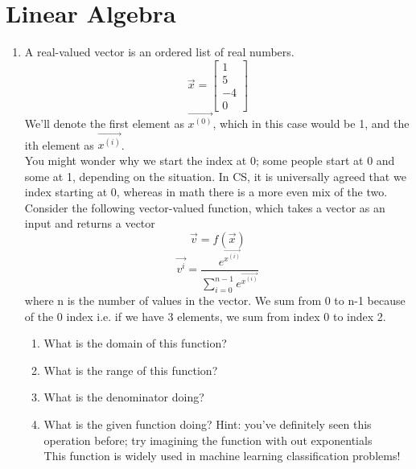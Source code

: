 \documentclass{article}
\begin{document}
\section{Linear Algebra}
\begin{enumerate}
    \item A real-valued vector is an ordered list of real numbers.
    \[ \vec{x} = \begin{bmatrix}1 \\ 5 \\ -4 \\ 0\end{bmatrix}\]
    We'll denote the first element as $\vec{x^{(0)}}$, which in this case would be 1, and the ith element as $\vec{x^{(i)}}$.\\
    You might wonder why we start the index at 0; some people start at 0 and some at 1, depending on the situation. In CS, it is universally agreed that we index starting at 0, whereas in math there is a more even mix of the two.\\
    Consider the following vector-valued function, which takes a vector as an input and returns a vector
    \[ \vec{v} = f(\vec{x})\]
    \[ \vec{v^{i}} = \frac{e^{\vec{x^{(i)}}}}{\sum\limits_{i=0}^{n-1} e^{\vec{x^{(i)}}}} \]
    where n is the number of values in the vector. We sum from 0 to n-1 because of the 0 index i.e. if we have 3 elements, we sum from index 0 to index 2. \\
    \begin{enumerate}
        \item What is the domain of this function?
        \item What is the range of this function?
        \item What is the denominator doing?
        \item What is the given function doing? Hint: you've definitely seen this operation before; try imagining the function with out exponentials\\
        \newline
        This function is widely used in machine learning classification problems!
    \end{enumerate}
    
    
\end{enumerate}
\end{document}
